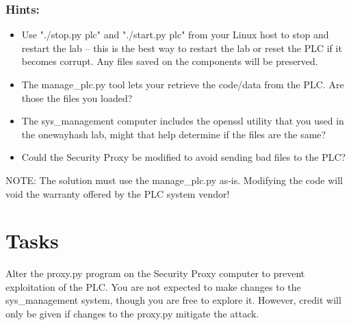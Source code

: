 \documentclass{article}
\begin{document}
\subsubsection{Hints:}
\begin{itemize}
\item Use "./stop.py plc" and "./start.py plc" from your Linux host to stop and restart the lab -- this is the
best way to restart the lab or reset the PLC if it becomes corrupt.  Any files saved on the components will be preserved.
\item The manage\_plc.py tool lets your retrieve the code/data from the PLC.  Are those the files you loaded?
\item The sys\_management computer includes the openssl utility that you used in the onewayhash lab, might that
help determine if the files are the same?
\item Could the Security Proxy be modified to avoid sending bad files to the PLC?
\end{itemize}
NOTE: The solution must use the manage\_plc.py as-is. Modifying the code will void the warranty offered by the PLC system vendor!

\section {Tasks}
Alter the proxy.py program on the Security Proxy computer to prevent exploitation of the PLC.
You are not expected to make changes to the sys\_management system, though you are free to explore it.
However, credit will only be given if changes to the proxy.py mitigate the attack.
\end{document}
